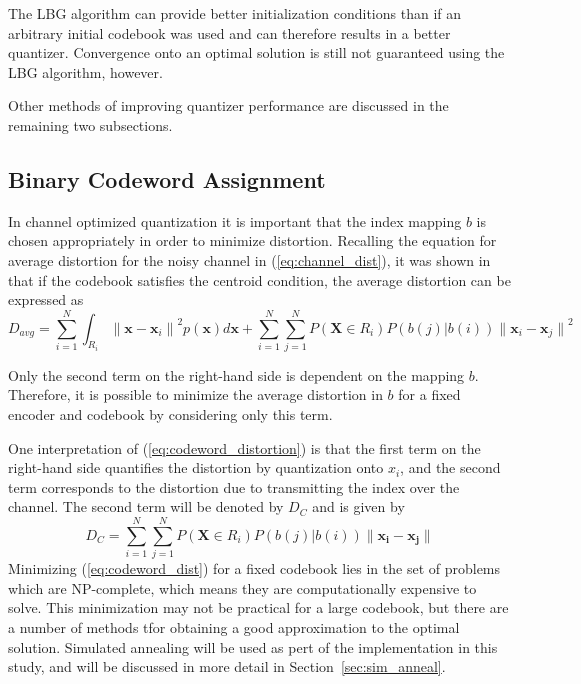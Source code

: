 \documentclass[10pt,twoside,titlepage]{article}
\newcommand{\bx}{\mathbf{x}}
\newcommand{\bX}{\mathbf{X}}
\begin{document}
The LBG algorithm can provide better initialization conditions than if an arbitrary initial codebook was used and can therefore results in a better quantizer. Convergence onto an optimal solution is still not guaranteed using the LBG algorithm, however.

Other methods of improving quantizer performance are discussed in the remaining two subsections.

\subsection{Binary Codeword Assignment}
\label{sec:code_assign}
In channel optimized quantization it is important that the index mapping $b$ is chosen appropriately in order to minimize distortion. Recalling the equation for average distortion for the noisy channel in (\ref{eq:channel_dist}), it was shown in \cite{favardin} that if the codebook satisfies the centroid condition, the average distortion can be expressed as
\begin{equation}
\label{eq:codeword_distortion}
D_{avg}  = \sum_{i=1}^N \int_{R_i} {\|\bx - \bx_i\|}^2p(\bx)d\bx + \sum_{i=1}^N \sum_{j=1}^N P(\bX \in R_i) P(b(j)|b(i)) {\|\bx_i - \bx_j\|}^2
\end{equation}

Only the second term on the right-hand side is dependent on the mapping $b$. Therefore, it is possible to minimize the average distortion in $b$ for a fixed encoder and codebook by considering only this term.

One interpretation of (\ref{eq:codeword_distortion}) is that the first term on the right-hand side quantifies the distortion by quantization onto $x_i$, and the second term corresponds to the distortion due to transmitting the index over the channel. The second term will be denoted by $D_C$ and is given by
\begin{equation}
  \label{eq:codeword_dist}
D_C = \sum_{i=1}^N \sum_{j=1}^N P(\mathbf{X} \in R_i) P(b(j)|b(i)) \|\mathbf{x_i} - \mathbf{x_j}\|
\end{equation}
Minimizing (\ref{eq:codeword_dist}) for a fixed codebook lies in the set of problems which are NP-complete, which means they are computationally expensive to solve. This minimization may not be practical for a large codebook, but there are a number of methods tfor obtaining a good approximation to the optimal solution. Simulated annealing will be used as pert of the implementation in this study, and will be discussed in more detail in Section~\ref{sec:sim_anneal}.
\end{document}

